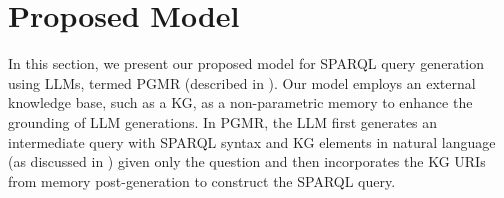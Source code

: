 \section{Proposed Model}
\label{sec:method}
In this section, we present our proposed model for SPARQL query generation using LLMs, termed PGMR (described in ). 
Our model employs an external knowledge base, such as a KG, as a non-parametric memory to enhance the grounding of LLM generations.
In PGMR, the LLM first generates an intermediate query with SPARQL syntax and KG elements in natural language (as discussed in ) given only the question and then incorporates the KG URIs from memory post-generation to construct the SPARQL query.





